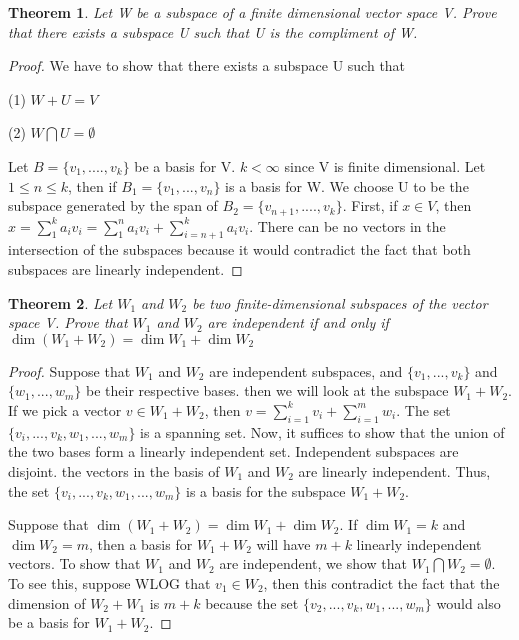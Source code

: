 \documentclass{article}
\theoremstyle{plain}
\newtheorem{theorem}{Theorem}
\theoremstyle{definition}
\begin{document}
\begin{theorem}
Let W be a subspace of a finite dimensional vector space V. Prove that there exists a subspace U such that U is the compliment of W.
\end{theorem}

\begin{proof}
We have to show that there exists a subspace U such that 


(1) $W + U = V$

(2) $W \bigcap U = \emptyset$

Let $B = \{v_{1},....,v_{k}\}$ be a basis for V. $k < \infty$ since V is finite dimensional. Let $ 1 \leq n \leq k$, then if $B_{1} = \{ v_{1}, ..., v_{n}\} $ is a basis for W. We choose U to be the subspace generated by the span of $B_{2} = \{ v_{n + 1},....,v_{k}\}$. First, if $x \in V$, then $x = \sum_{1}^{k} a_{i}v_{i} = \sum_{1}^{n} a_{i}v_{i} + \sum_{i = n + 1}^{k} a_{i}v_{i}$. There can be no vectors in the intersection of the subspaces because it would contradict the fact that both subspaces are linearly independent.
\end{proof}
\begin{theorem}
Let $W_{1}$ and $W_{2}$ be two finite-dimensional subspaces of the vector space V. Prove that $W_{1}$ and $W_{2}$ are independent if and only if $\dim( W_{1} + W_{2}) = \dim W_{1} + \dim W_{2}$
\end{theorem}
\begin{proof}
Suppose that $W_{1}$ and $W_{2}$ are independent subspaces, and $\{v_{1},...,v_{k}\}$ and $\{ w_{1},...,w_{m}\}$ be their respective bases. then we will look at the subspace $W_{1} + W_{2}$. If we pick a vector $v \in W_{1} + W_{2}$, then $v = \sum_{i = 1}^{k} v_{i} + \sum_{i = 1}^{m} w_{i}$. The set $\{ v_{i},...,v_{k},w_{1},...,w_{m}\}$ is a spanning set. Now, it suffices to show that  the union of the two bases form a linearly independent set. Independent subspaces are disjoint. the vectors in the basis of $W_{1}$ and $W_{2}$ are linearly independent. Thus, the set $\{ v_{i},...,v_{k},w_{1},...,w_{m}\}$ is a basis for the subspace $W_{1} + W_{2}$. 

Suppose that $\dim(W_{1} + W_{2}) = \dim W_{1} + \dim W_{2}$. If $\dim W_{1} = k$ and $\dim W_{2} = m$, then a basis for $W_{1} + W_{2}$ will have $m + k$ linearly independent vectors. To show that $W_{1}$ and $W_{2}$ are independent, we show that $W_{1} \bigcap W_{2} = \emptyset$. To see this, suppose WLOG that $v_{1} \in W_{2}$, then this contradict the fact that the dimension of $W_{2} + W_{1}$ is $m + k$ because the set $\{ v_{2},...,v_{k}, w_{1},...,w_{m}\}$ would also be a basis for $W_{1} + W_{2}.$
\end{proof}
\end{document}
